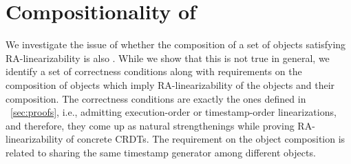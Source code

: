 
\section{Compositionality of \CRDTLin{}}
\label{sec:compositionality}




We investigate the issue of whether the composition of a set of objects satisfying RA-linearizability is also \crdtlinearizable{}. While we show that this is not true in general, we identify a set of correctness conditions along with requirements on the composition of objects which imply RA-linearizability of the objects and their composition. The correctness conditions are exactly the ones defined in \sectionautorefname~\ref{sec:proofs}, i.e., admitting execution-order or timestamp-order linearizations, and therefore, they come up as natural strengthenings while proving RA-linearizability of concrete CRDTs. The requirement on the object composition is related to sharing the same timestamp generator among different objects.

